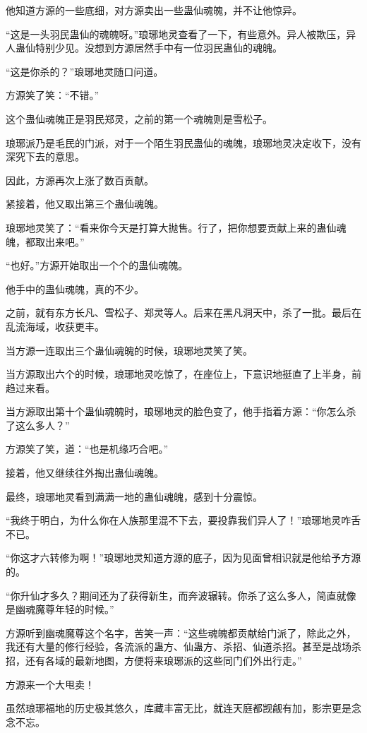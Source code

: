 \begin{this_body}
他知道方源的一些底细，对方源卖出一些蛊仙魂魄，并不让他惊异。

“这是一头羽民蛊仙的魂魄呀。”琅琊地灵查看了一下，有些意外。异人被欺压，异人蛊仙特别少见。没想到方源居然手中有一位羽民蛊仙的魂魄。

“这是你杀的？”琅琊地灵随口问道。

方源笑了笑：“不错。”

这个蛊仙魂魄正是羽民郑灵，之前的第一个魂魄则是雪松子。

琅琊派乃是毛民的门派，对于一个陌生羽民蛊仙的魂魄，琅琊地灵决定收下，没有深究下去的意思。

因此，方源再次上涨了数百贡献。

紧接着，他又取出第三个蛊仙魂魄。

琅琊地灵笑了：“看来你今天是打算大抛售。行了，把你想要贡献上来的蛊仙魂魄，都取出来吧。”

“也好。”方源开始取出一个个的蛊仙魂魄。

他手中的蛊仙魂魄，真的不少。

之前，就有东方长凡、雪松子、郑灵等人。后来在黑凡洞天中，杀了一批。最后在乱流海域，收获更丰。

当方源一连取出三个蛊仙魂魄的时候，琅琊地灵笑了笑。

当方源取出六个的时候，琅琊地灵吃惊了，在座位上，下意识地挺直了上半身，前趋过来看。

当方源取出第十个蛊仙魂魄时，琅琊地灵的脸色变了，他手指着方源：“你怎么杀了这么多人？”

方源笑了笑，道：“也是机缘巧合吧。”

接着，他又继续往外掏出蛊仙魂魄。

最终，琅琊地灵看到满满一地的蛊仙魂魄，感到十分震惊。

“我终于明白，为什么你在人族那里混不下去，要投靠我们异人了！”琅琊地灵咋舌不已。

“你这才六转修为啊！”琅琊地灵知道方源的底子，因为见面曾相识就是他给予方源的。

“你升仙才多久？期间还为了获得新生，而奔波辗转。你杀了这么多人，简直就像是幽魂魔尊年轻的时候。”

方源听到幽魂魔尊这个名字，苦笑一声：“这些魂魄都贡献给门派了，除此之外，我还有大量的修行经验，各流派的蛊方、仙蛊方、杀招、仙道杀招。甚至是战场杀招，还有各域的最新地图，方便将来琅琊派的这些同门们外出行走。”

方源来一个大甩卖！

虽然琅琊福地的历史极其悠久，库藏丰富无比，就连天庭都觊觎有加，影宗更是念念不忘。


\end{this_body}
